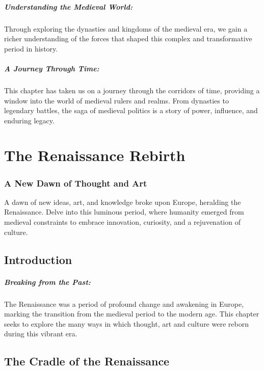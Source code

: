 \documentclass[a4paper,12pt]{book}
\begin{document}
\paragraph{Understanding the Medieval World:}
Through exploring the dynasties and kingdoms of the medieval era, we gain a richer understanding of the forces that shaped this complex and transformative period in history.

\paragraph{A Journey Through Time:}
This chapter has taken us on a journey through the corridors of time, providing a window into the world of medieval rulers and realms. From dynasties to legendary battles, the saga of medieval politics is a story of power, influence, and enduring legacy.

\chapter{The Renaissance Rebirth}
\subsection*{A New Dawn of Thought and Art}
A dawn of new ideas, art, and knowledge broke upon Europe, heralding the Renaissance. Delve into this luminous period, where humanity emerged from medieval constraints to embrace innovation, curiosity, and a rejuvenation of culture.

\section*{Introduction}

\paragraph{Breaking from the Past:}
The Renaissance was a period of profound change and awakening in Europe, marking the transition from the medieval period to the modern age. This chapter seeks to explore the many ways in which thought, art and culture were reborn during this vibrant era.

\section*{The Cradle of the Renaissance}
\end{document}
